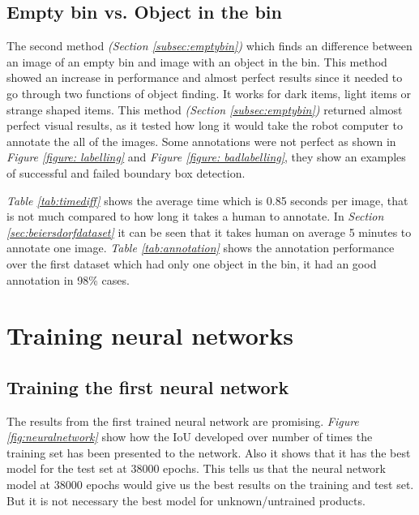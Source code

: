 \subsection{Empty bin vs. Object in the bin}
The second method \textit{(Section \ref{subsec:emptybin})} which finds an difference between an image of an empty bin and image with an object in the bin. 
This method showed an increase in performance and almost perfect results since it needed to go through two functions of object finding. It works for dark items, light items or strange shaped items. 
This method \textit{(Section \ref{subsec:emptybin})} returned almost perfect visual results, as it tested how long it would take the robot computer to annotate the all of the images. Some annotations were not perfect as shown in \textit{Figure \ref{figure: labelling}} and \textit{Figure \ref{figure: badlabelling}}, they show an examples of successful and failed boundary box detection.

\textit{Table \ref{tab:timediff}} shows the average time which is 0.85 seconds per image, that is not much compared to how long it takes a human to annotate. In \textit{Section \ref{sec:beiersdorfdataset}} it can be seen that it takes human on average 5 minutes to annotate one image. \textit{Table \ref{tab:annotation}} shows the annotation performance over the first dataset which had only one object in the bin, it had an good annotation in 98\% cases.



\section{Training neural networks} 
\subsection{Training the first neural network}
The results from the first trained neural network are promising. \textit{Figure \ref{fig:neuralnetwork}} show how the IoU developed over number of times the training set has been presented to the network. Also it shows that it has the best model for the test set at 38000 epochs. This tells us that the neural network model at 38000 epochs would give us the best results on the training and test set. But it is not necessary the best model for unknown/untrained products.

